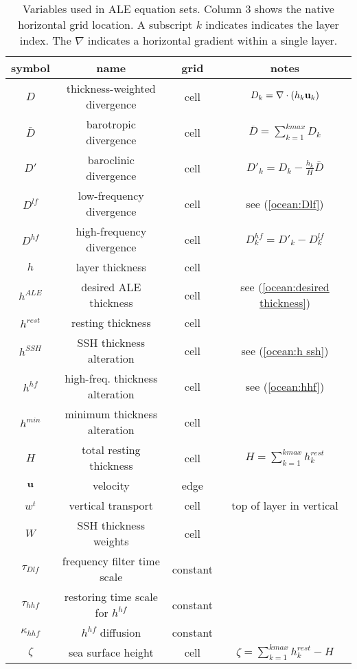 \begin{table}[h!t] 
\caption{Variables used in ALE equation sets.  Column 3 shows the native horizontal grid location.  A subscript $k$ indicates indicates the layer index.  The $\nabla$ indicates a horizontal gradient within a single layer.} 
\vspace{0.5cm} \centering 
\begin{tabular}{c c c c } 
\hline\hline symbol &  name & grid &  notes  \\
\hline 
$D$  & thickness-weighted divergence & cell & $D_k = \nabla \cdot  \left( h_k {\bf u}_k \right)$  \\ 
${\bar D}$ & barotropic divergence & cell & ${\overline D} = \sum\limits_{k=1}^{kmax} D_k$  \\ 
$D'$  & baroclinic divergence & cell & $D'_k = D_k-\frac{h_k}{H}{\bar D}$  \\ 
$D^{lf}$  & low-frequency divergence & cell & see (\ref{ocean:Dlf})  \\ 
$D^{hf}$  & high-frequency divergence & cell & $D^{hf}_k = D'_k - D^{lf}_k$  \\ 
$h$  & layer thickness & cell &   \\ 
$h^{ALE}$  & desired ALE thickness & cell & see (\ref{ocean:desired thickness})  \\ 
$h^{rest}$  & resting thickness & cell &   \\ 
$h^{SSH}$  & SSH thickness alteration & cell & see (\ref{ocean:h ssh})  \\ 
$h^{hf}$  & high-freq. thickness alteration & cell &   see (\ref{ocean:hhf})  \\ 
$h^{min}$  & minimum thickness alteration & cell &   \\ 
$H$  & total resting thickness & cell & $H= \sum\limits_{k=1}^{kmax} h_k^{rest}$  \\ 
${\bf u}$  & velocity & edge &   \\ 
$w^t$ & vertical transport & cell  & top of layer in vertical \\
$W$  & SSH thickness weights & cell &   \\ 
$\tau_{Dlf}$  & frequency filter time scale & constant &   \\ 
$\tau_{hhf}$  & restoring time scale for $h^{hf}$ & constant &   \\ 
$\kappa_{hhf}$  & $h^{hf}$ diffusion & constant &   \\ 
$\zeta$  & sea surface height & cell &  $\zeta= \sum\limits_{k=1}^{kmax} h_k^{rest} - H$  \\ 
\hline 
\end{tabular} \label{oceanTable:ALE_variables} 
\end{table}

